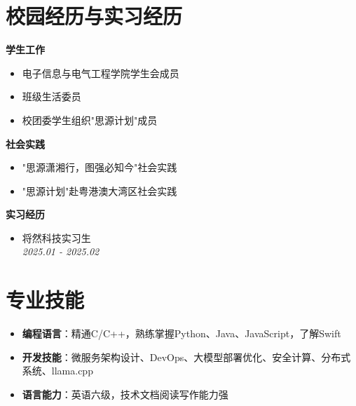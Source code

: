 \documentclass[a4paper]{article}
\begin{document}
\section*{校园经历与实习经历}
\hspace{-0.5cm}
\begin{minipage}[t]{0.38\textwidth}
\textbf{学生工作}
\begin{itemize}[leftmargin=*,itemsep=0.1em,topsep=0.1em]
\item 电子信息与电气工程学院学生会成员
\item 班级生活委员
\item 校团委学生组织"思源计划"成员
\end{itemize}
\end{minipage}
\begin{minipage}[t]{0.38\textwidth}
\textbf{社会实践}
\begin{itemize}[leftmargin=*,itemsep=0.1em,topsep=0.1em]
\item "思源潇湘行，图强必知今"社会实践
\item "思源计划"赴粤港澳大湾区社会实践
\end{itemize}
\end{minipage}
\begin{minipage}[t]{0.24\textwidth}
\textbf{实习经历}
\begin{itemize}[leftmargin=*,itemsep=0.1em,topsep=0.1em]
\item 将然科技实习生 \\ 
\textit{2025.01 - 2025.02} \\
\end{itemize}
\end{minipage}

\section*{专业技能}
\begin{itemize}[leftmargin=*,itemsep=0.2em,topsep=0.2em]
\item \textbf{编程语言}：精通C/C++，熟练掌握Python、Java、JavaScript，了解Swift
\item \textbf{开发技能}：微服务架构设计、DevOps、大模型部署优化、安全计算、分布式系统、llama.cpp
\item \textbf{语言能力}：英语六级，技术文档阅读写作能力强
\end{itemize}
\end{document}
